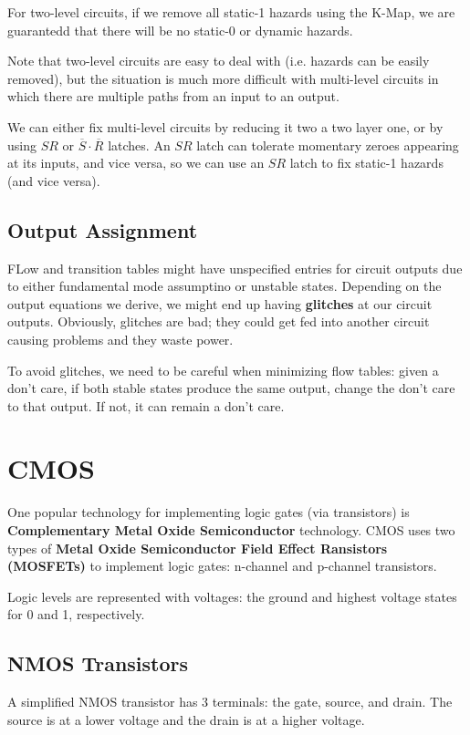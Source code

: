\documentclass[12pt]{article}
\begin{document}
For two-level circuits, if we remove all static-1 hazards using the K-Map, we are guarantedd that there will be no static-0 or dynamic hazards.

Note that two-level circuits are easy to deal with (i.e. hazards can be easily removed), but the situation is much more difficult with multi-level circuits in which there are multiple paths from an input to an output.

We can either fix multi-level circuits by reducing it two a two layer one, or by using $SR$ or $\overline{S}\cdot\overline{R}$ latches. An $SR$ latch can tolerate momentary zeroes appearing at its inputs, and vice versa, so we can use an $SR$ latch to fix static-1 hazards (and vice versa).

\subsection*{Output Assignment}
FLow and transition tables might have unspecified entries for circuit outputs due to either fundamental mode assumptino or unstable states. Depending on the output equations we derive, we might end up having {\bf glitches} at our circuit outputs. Obviously, glitches are bad; they could get fed into another circuit causing problems and they waste power.

To avoid glitches, we need to be careful when minimizing flow tables: given a don't care, if both stable states produce the same output, change the don't care to that output. If not, it can remain a don't care.

\section*{CMOS}
One popular technology for implementing logic gates (via transistors) is {\bf Complementary Metal Oxide Semiconductor} technology. CMOS uses two types of {\bf Metal Oxide Semiconductor Field Effect Ransistors (MOSFETs)} to implement logic gates: n-channel and p-channel transistors.

Logic levels are represented with voltages: the ground and highest voltage states for 0 and 1, respectively.

\subsection*{NMOS Transistors}
A simplified NMOS transistor has 3 terminals: the gate, source, and drain. The source is at a lower voltage and the drain is at a higher voltage.
\end{document}
